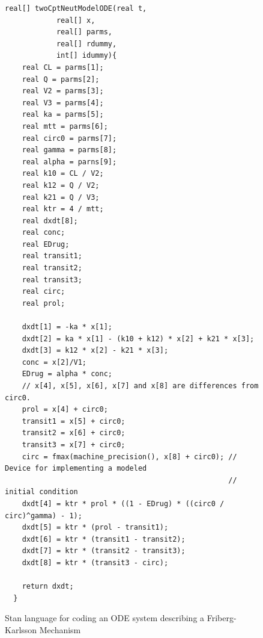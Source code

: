 \documentclass[11pt]{amsart}
\newenvironment{fmpage}[1]
     {\begin{lrbox}{\fmbox}\begin{minipage}{#1}}
     {\end{minipage}\end{lrbox}\fbox{\usebox{\fmbox}}}
\begin{document}
\begin{figure}
\caption{Stan language for coding an ODE system describing a Friberg-Karlsson Mechanism}
\begin{tiny}
\begin{center}
\begin{fmpage}{\textwidth - .75in}
\begin{lstlisting}[basicstyle=\tiny\ttfamily,mathescape=true,flexiblecolumns=true,frame=single,escapeinside=`']
    real[] twoCptNeutModelODE(real t,
			real[] x,
			real[] parms,
			real[] rdummy,
			int[] idummy){
    real CL = parms[1];
    real Q = parms[2];
    real V2 = parms[3];
    real V3 = parms[4];
    real ka = parms[5];
    real mtt = parms[6];
    real circ0 = parms[7];
    real gamma = parms[8];
    real alpha = parns[9];
    real k10 = CL / V2;
    real k12 = Q / V2;
    real k21 = Q / V3;
    real ktr = 4 / mtt;
    real dxdt[8];
    real conc;
    real EDrug;
    real transit1;
    real transit2;
    real transit3;
    real circ;
    real prol;
  
    dxdt[1] = -ka * x[1];
    dxdt[2] = ka * x[1] - (k10 + k12) * x[2] + k21 * x[3];
    dxdt[3] = k12 * x[2] - k21 * x[3];
    conc = x[2]/V1;
    EDrug = alpha * conc;
    // x[4], x[5], x[6], x[7] and x[8] are differences from circ0.
    prol = x[4] + circ0;
    transit1 = x[5] + circ0;
    transit2 = x[6] + circ0;
    transit3 = x[7] + circ0;
    circ = fmax(machine_precision(), x[8] + circ0); // Device for implementing a modeled 
                                                    // initial condition
    dxdt[4] = ktr * prol * ((1 - EDrug) * ((circ0 / circ)^gamma) - 1);
    dxdt[5] = ktr * (prol - transit1);
    dxdt[6] = ktr * (transit1 - transit2);
    dxdt[7] = ktr * (transit2 - transit3);
    dxdt[8] = ktr * (transit3 - circ);

    return dxdt;
  }
\end{lstlisting}
\end{fmpage}
\end{center}
\end{tiny} 
\label{FKODECode}
\end{figure}
\end{document}
